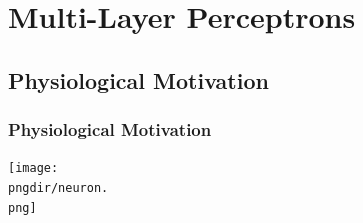 \section{Multi-Layer Perceptrons}

\subsection{Physiological Motivation}

\begin{frame}
  \frametitle{Physiological Motivation}
  
  \begin{center}
    \texttt{[image: \\pngdir/neuron.\\png]}
  \end{center}
\end{frame}


